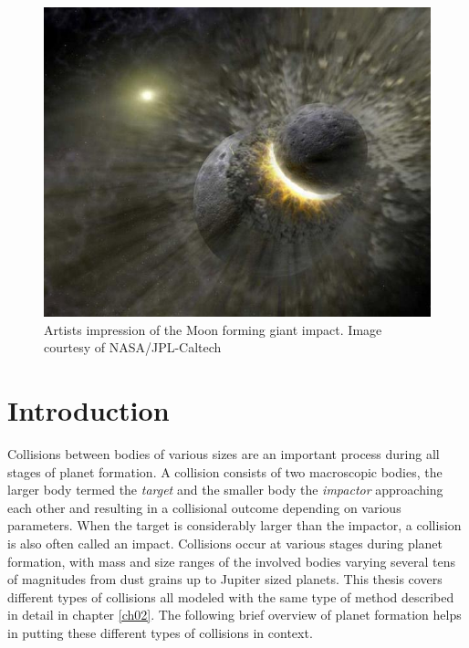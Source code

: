 

\begin{figure}
\begin{center}
\includegraphics[scale=0.7]{01figs/01planet-collision.jpg}
\caption{Artists impression of the Moon forming giant impact. Image courtesy of NASA/JPL-Caltech}
\label{ch01_fig01}
\end{center}
\end{figure}


\chapter{Introduction}
\label{ch01}
\graphicspath{{./01figs/}}
Collisions between bodies of various sizes are an important process during all stages of planet formation. A collision consists of two macroscopic bodies, the larger body termed the \emph{target} and the smaller body the \emph{impactor} approaching each other and resulting in a collisional outcome depending on various parameters. When the target is considerably larger than the impactor, a collision is also often called an impact. Collisions occur at various stages during planet formation, with mass and size ranges of the involved bodies varying several tens of magnitudes from dust grains up to Jupiter sized planets. This thesis covers different types of collisions all modeled with the same type of method described in detail in chapter \ref{ch02}. The following brief overview of planet formation helps in putting these different types of collisions in context.

